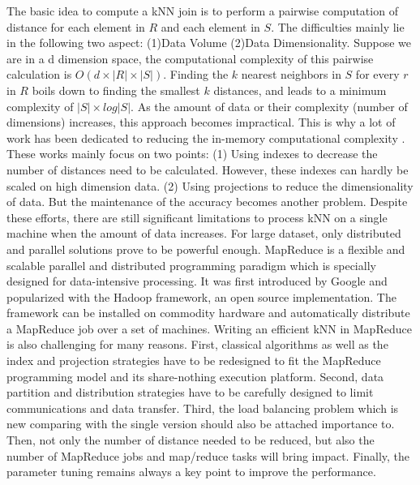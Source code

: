 The basic idea to compute a kNN join is to perform  a pairwise computation of distance for each element in $R$ and each 
element in $S$. The difficulties mainly lie in the following two aspect: (1)Data Volume (2)Data Dimensionality. 
Suppose we are in a d dimension space, the computational 
complexity of this pairwise calculation is $O(d \times \left|R\right| \times \left| S \right|)$. Finding the $k$ 
nearest neighbors in $S$ for every $r$ in $R$ 
boils down to finding the smallest $k$ distances, and leads to a minimum complexity of $\left| S \right| \times log 
\left| S \right|$. As the amount of data or their complexity (number of dimensions) increases, this approach becomes 
impractical. This is why a lot of work has been dedicated to reducing the in-memory 
computational 
complexity \cite{DBLP:journals/tods/JagadishOTYZ05_full,MuX_full,
Ciaccia:1997:MEA:645923.671005,DBLP:journals/geoinformatica/YuZHX10,
Bentley:1975:MBS:361002.361007}. These works mainly focus on two points: (1) Using indexes to decrease the number of 
distances need to be calculated. However, these indexes can hardly be scaled on high dimension data. (2) Using 
projections to reduce the dimensionality of data. But the maintenance of the accuracy becomes another problem. Despite 
these efforts, there are still significant limitations to process kNN on a single machine when the amount of data 
increases. For large dataset, only distributed and parallel solutions prove to be powerful enough. 
MapReduce is a flexible and scalable parallel and distributed programming paradigm which is specially designed for 
data-intensive processing. It was first 
introduced by Google \cite{Dean:2008:MSD:1327452.1327492} and popularized with the Hadoop framework, an open source 
implementation. 
The framework can be 
installed on commodity hardware and automatically distribute a MapReduce job over a set of machines. Writing an 
efficient kNN in MapReduce is also
challenging for many reasons. 
First, classical algorithms as well as the index and projection strategies have to be redesigned to fit the MapReduce 
programming model and its share-nothing execution platform. 
Second, data partition and distribution strategies have to be carefully designed to limit 
communications and data transfer. 
Third, the load balancing problem which is new comparing with the single version should also be attached importance to. 
Then, not only the number of distance needed to be reduced, but also the number of MapReduce jobs and map/reduce tasks 
will bring impact.
Finally, the parameter tuning remains always a key point to improve the performance.


